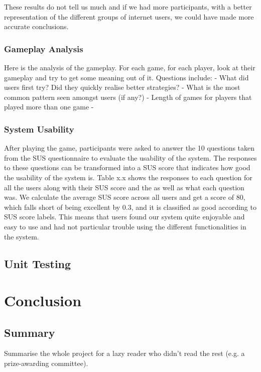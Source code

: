 \documentclass{l4proj}
\begin{document}
These results do not tell us much and if we had more participants, with a better representation of the different groups of internet users, we could have made more accurate conclusions.

\subsection{Gameplay Analysis}
Here is the analysis of the gameplay. For each game, for each player, look at their gameplay and try to get some meaning out of it.
Questions include:
 - What did users first try? Did they quickly realise better strategies?
 - What is the most common pattern seen amongst users (if any?)
 - Length of games for players that played more than one game
 - 

\subsection{System Usability}
After playing the game, participants were asked to answer the 10 questions taken from the SUS questionnaire to evaluate the usability of the system. The responses to these questions can be transformed into a SUS score that indicates how good the usability of the system is. Table x.x shows the responses to each question for all the users along with their SUS score and the as well as what each question was. We calculate the average SUS score across all users and get a score of 80, which falls short of being excellent by 0.3, and it is classified as good according to SUS score labels. This means that users found our system quite enjoyable and easy to use and had not particular trouble using the different functionalities in the system.

\section{Unit Testing} 

\chapter{Conclusion}    

\section{Summary}
Summarise the whole project for a lazy reader who didn't read the rest (e.g. a prize-awarding committee).
\end{document}
